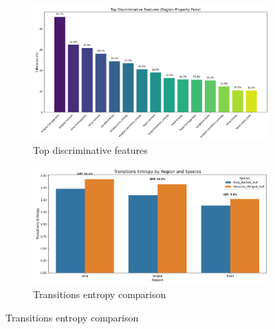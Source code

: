 \documentclass[a4paper,12pt]{report}
\begin{document}
\begin{figure}[H]
    \begin{subfigure}[t]{0.48\textwidth}
        \centering
        \includegraphics[width=\textwidth]{images/appendix/Original/top_discriminative_features.png}
        \caption{Top discriminative features}
    \end{subfigure}
    \hfill
    \begin{subfigure}[t]{0.48\textwidth}
        \centering
        \includegraphics[width=\textwidth]{images/appendix/Original/transitions_entropy_comparison.png}
        \caption{Transitions entropy comparison}
    \end{subfigure}
    
    \vspace{0.5cm}
    

\end{figure}
\end{document}
